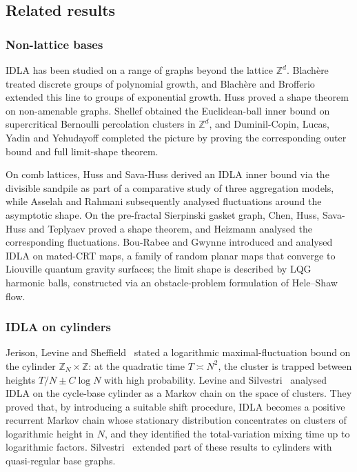 \documentclass[11pt,a4paper,reqno]{amsart}
\theoremstyle{definition}
\newcommand{\bbZ}{{\ensuremath{\mathbb Z}} }
\begin{document}
\subsection{Related results}

\subsubsection{Non-lattice bases}
IDLA has been studied on a range of graphs beyond the lattice $\bbZ^d$. Blach{\`e}re \cite{blachere2004internal} treated discrete groups of polynomial growth, and Blach{\`e}re and Brofferio \cite{blachere2007internal} extended this line to groups of exponential growth. Huss \cite{huss2008internal} proved a shape theorem on non-amenable graphs. Shellef \cite{shellef2010idla} obtained the Euclidean-ball inner bound on supercritical Bernoulli percolation clusters in $\bbZ^d$, and Duminil-Copin, Lucas, Yadin and Yehudayoff \cite{duminil2013containing} completed the picture by proving the corresponding outer bound and full limit-shape theorem.

On comb lattices, Huss and Sava-Huss \cite{huss2012internal} derived an IDLA inner bound via the divisible sandpile as part of a comparative study of three aggregation models, while Asselah and Rahmani \cite{asselah2016fluctuations} subsequently analysed fluctuations around the asymptotic shape. On the pre-fractal Sierpinski gasket graph, Chen, Huss, Sava-Huss and Teplyaev \cite{chen2017internal} proved a shape theorem, and Heizmann \cite{heizmann2023fluctuations} analysed the corresponding fluctuations. Bou-Rabee and Gwynne \cite{bourabee2022harmonic, bourabee2022matedcrt} introduced and analysed IDLA on mated-CRT maps, a family of random planar maps that converge to Liouville quantum gravity surfaces; the limit shape is described by LQG harmonic balls, constructed via an obstacle-problem formulation of Hele--Shaw flow.


\subsubsection{IDLA on cylinders}
Jerison, Levine and Sheffield~\cite{jerison2014internal2} stated a logarithmic maximal-fluctuation bound on the cylinder $\bbZ_N \times \bbZ$: at the quadratic time $T \asymp N^2$, the cluster is trapped between heights $T/N \pm C \log N$ with high probability. Levine and Silvestri~\cite{levine2018long} analysed IDLA on the cycle-base cylinder as a Markov chain on the space of clusters. They proved that, by introducing a suitable shift procedure, IDLA becomes a positive recurrent Markov chain whose stationary distribution concentrates on clusters of logarithmic height in $N$, and they identified the total-variation mixing time  up to logarithmic factors. Silvestri~\cite{silvestri2020internal} extended part of these results to cylinders with quasi-regular base graphs.
\end{document}
